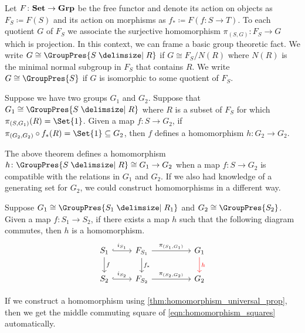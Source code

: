 Let $F \colon \mathbf{Set} \to \mathbf{Grp}$ be the free functor and denote its action on objects as $F_S \coloneqq F(S)$ and its action on morphisms as  $f_* \coloneqq F(f \colon S \to T)$.
To each quotient $G$ of $F_S$ we associate the surjective homomorphism $\pi_{(S,G)} \colon F_S \to G$ which is projection.
In this context, we can frame a basic group theoretic fact.
We write $G \cong \GroupPres{S \relations R}$ if  $G \cong F_S / N(R)$ where $N(R)$ is the minimal normal subgroup in $F_S$ that contains $R$.
We write  $G \cong \GroupPres{S}$ if  $G$ is isomorphic to some quotient of  $F_S$.

\begin{basic_fact}
	Suppose we have two groups $G_1$ and $G_2$.
	Suppose that $G_1 \cong \GroupPres{S \relations R}$ where $R$ is a subset of $F_S$ for which $\pi_{(S,G_1)}(R) = \Set{1}$.
	Given a map $f \colon S \to G_2$, if  $\pi_{(G_2, G_2)} \circ f_*(R) = \Set{1} \subseteq G_2$, then $f$ defines a homomorphism $h \colon G_2 \to G_2$.
	\label{thm:homomorphism_universal_prop}
\end{basic_fact}

The above theorem defines a homomorphism $h \colon \GroupPres{S \relations R} \cong G_1 \to G_2$ when a map $f \colon S \to G_2$ is compatible with the relations in $G_1$ and $G_2$.
If we also had knowledge of a generating set for $G_2$, we could construct homomorphisms in a different way.
\begin{basic_fact}
	Suppose $G_1 \cong \GroupPres{S_1 \relations R_1}$ and $G_2 \cong \GroupPres{S_2}$.
	Given a map $f \colon S_1 \to S_2$, if there exists a map  $h$ such that the following diagram commutes, then $h$ is a homomorphism.
	\begin{equation}
		\begin{tikzcd}
			S_1 \ar[d, "f"] \ar[r, hook, "i_{S_1}"] & F_{S_1} \ar[d, "f_*"] \ar[rr, "\pi_{(S_1, G_1)}"] & & \ar[d, color=red, "h"] G_1 \\
			S_2 \ar[r, hook, "i_{S_2}"] & F_{S_2} \ar[rr, "\pi_{(S_2, G_2)}"] & & G_2
		\end{tikzcd}
		\label{eqn:homomorphism_squares}
	\end{equation}
	\label{thm:homomorphism_squares}
\end{basic_fact}

\begin{remark}
	If we construct a homomorphism using \cref{thm:homomorphism_universal_prop}, then we get the middle commuting square of \eqref{eqn:homomorphism_squares} automatically.
	\label{rmk:universal_prop_homomorphism_gives_squares}
\end{remark}

